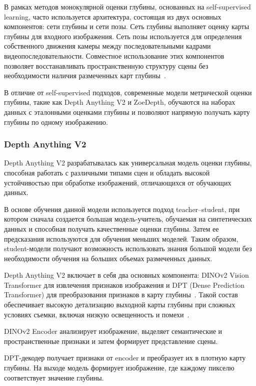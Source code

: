\documentclass{misisarticle}
\begin{document}
В рамках методов монокулярной оценки глубины, основанных на self-supervised learning, часто используется архитектура, состоящая из двух основных компонентов: сети глубины и сети позы. Сеть глубины выполняет оценку карты глубины для входного изображения. Сеть позы используется для определения собственного движения камеры между последовательными кадрами видеопоследовательности. Совместное использование этих компонентов позволяет восстанавливать пространственную структуру сцены без необходимости наличия размеченных карт глубины~\cite{ref3}.

В отличие от self-supervised подходов, современные модели метрической оценки глубины, такие как Depth Anything V2 и ZoeDepth, обучаются на наборах данных с эталонными оценками глубины и позволяют напрямую получать карту глубины по одному изображению.

\subsubsection{Depth Anything V2}

Depth Anything V2 разрабатывалась как универсальная модель оценки глубины, способная работать с различными типами сцен и обладать высокой устойчивостью при обработке изображений, отличающихся от обучающих данных.

В основе обучения данной модели используется подход teacher--student, при котором сначала создается большая модель-учитель, обучаемая на синтетических данных и способная получать качественные оценки глубины. Затем ее предсказания используются для обучения меньших моделей. Таким образом, student-модели получают возможность использовать знания большой модели без необходимости обучения на больших объемах размеченных данных.

Depth Anything V2 включает в себя два основных компонента: DINOv2 Vision Transformer для извлечения признаков изображения и DPT (Dense Prediction Transformer) для преобразования признаков в карту глубины~\cite{ref4}. Такой состав обеспечивает высокую детализацию выходной карты глубины при сложных условиях съемки, включая низкую освещенность и помехи~\cite{ref5}.

DINOv2 Encoder анализирует изображение, выделяет семантические и пространственные признаки и затем формирует представление сцены.

DPT-декодер получает признаки от encoder и преобразует их в плотную карту глубины. На выходе модель формирует изображение, где каждому пикселю соответствует значение глубины.
\end{document}
